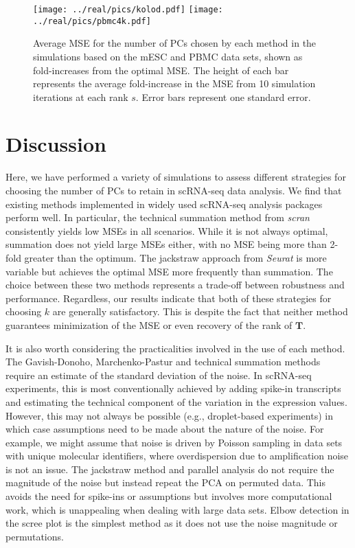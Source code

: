 \documentclass[10pt,letterpaper]{article}
\begin{document}
\begin{figure}[btp]
\begin{center}
\texttt{[image: ../real/pics/kolod.pdf]}
\texttt{[image: ../real/pics/pbmc4k.pdf]}
\end{center}
\caption{Average MSE for the number of PCs chosen by each method in the simulations based on the mESC and PBMC data sets, shown as fold-increases from the optimal MSE.
The height of each bar represents the average fold-increase in the MSE from 10 simulation iterations at each rank $s$.
Error bars represent one standard error.}
\label{fig:real}
\end{figure}

\section{Discussion}
Here, we have performed a variety of simulations to assess different strategies for choosing the number of PCs to retain in scRNA-seq data analysis.
We find that existing methods implemented in widely used scRNA-seq analysis packages perform well.
In particular, the technical summation method from \textit{scran} consistently yields low MSEs in all scenarios.
While it is not always optimal, summation does not yield large MSEs either, with no MSE being more than 2-fold greater than the optimum.
The jackstraw approach from \textit{Seurat} is more variable but achieves the optimal MSE more frequently than summation.
The choice between these two methods represents a trade-off between robustness and performance.
Regardless, our results indicate that both of these strategies for choosing $k$ are generally satisfactory.
This is despite the fact that neither method guarantees minimization of the MSE or even recovery of the rank of $\mathbf{T}$.

It is also worth considering the practicalities involved in the use of each method.
The Gavish-Donoho, Marchenko-Pastur and technical summation methods require an estimate of the standard deviation of the noise.
In scRNA-seq experiments, this is most conventionally achieved by adding spike-in transcripts and estimating the technical component of the variation in the expression values.
However, this may not always be possible (e.g., droplet-based experiments) in which case assumptions need to be made about the nature of the noise.
For example, we might assume that noise is driven by Poisson sampling in data sets with unique molecular identifiers, where overdispersion due to amplification noise is not an issue.
The jackstraw method and parallel analysis do not require the magnitude of the noise but instead repeat the PCA on permuted data.
This avoids the need for spike-ins or assumptions but involves more computational work, which is unappealing when dealing with large data sets.
Elbow detection in the scree plot is the simplest method as it does not use the noise magnitude or permutations.
\end{document}
